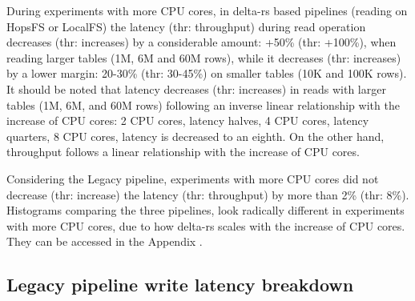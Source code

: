 During experiments with more \gls{CPU} cores, in delta-rs based pipelines (reading on \gls{HopsFS} or \gls{LocalFS}) the latency (thr: throughput) during read operation decreases (thr: increases) by a considerable amount: +50\% (thr: +100\%), when reading larger tables (1M, 6M and 60M rows), while it decreases (thr: increases) by a lower margin: 20-30\% (thr: 30-45\%) on smaller tables (10K and 100K rows). It should be noted that latency decreases (thr: increases) in reads with larger tables (1M, 6M, and 60M rows) following an inverse linear relationship with the increase of \gls{CPU} cores: 2 \gls{CPU} cores, latency halves, 4 \gls{CPU} cores, latency quarters, 8 \gls{CPU} cores, latency is decreased to an eighth. On the other hand, throughput follows a linear relationship with the increase of \gls{CPU} cores.

Considering the Legacy pipeline, experiments with more \gls{CPU} cores did not decrease (thr: increase) the latency (thr: throughput) by more than 2\% (thr: 8\%). Histograms comparing the three pipelines, look radically different in experiments with more \gls{CPU} cores, due to how delta-rs scales with the increase of \gls{CPU} cores. They can be accessed in the Appendix .

\subsection{Legacy pipeline write latency breakdown}

